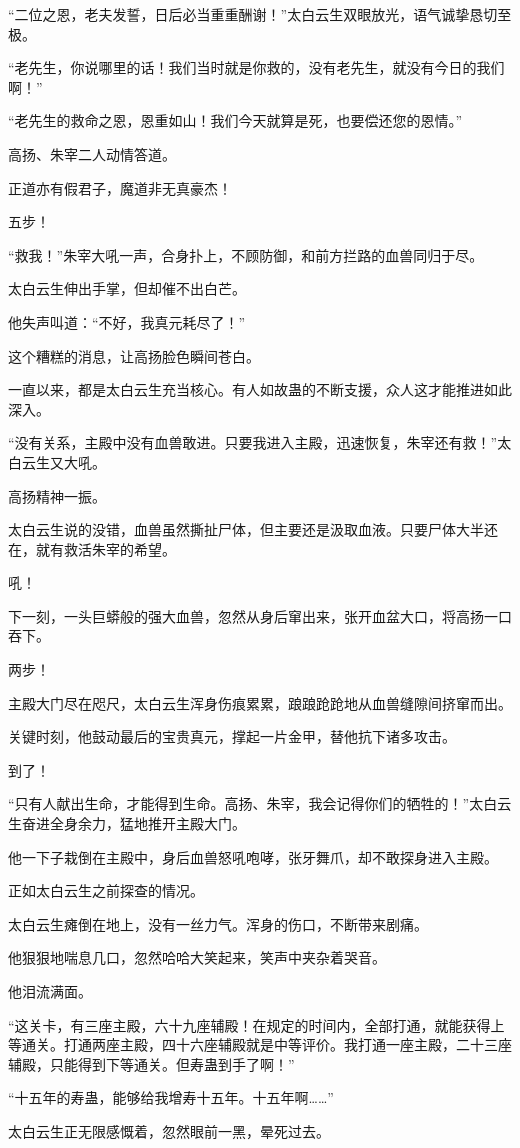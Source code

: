 \begin{this_body}
“二位之恩，老夫发誓，日后必当重重酬谢！”太白云生双眼放光，语气诚挚恳切至极。

“老先生，你说哪里的话！我们当时就是你救的，没有老先生，就没有今日的我们啊！”

“老先生的救命之恩，恩重如山！我们今天就算是死，也要偿还您的恩情。”

高扬、朱宰二人动情答道。

正道亦有假君子，魔道非无真豪杰！

五步！

“救我！”朱宰大吼一声，合身扑上，不顾防御，和前方拦路的血兽同归于尽。

太白云生伸出手掌，但却催不出白芒。

他失声叫道：“不好，我真元耗尽了！”

这个糟糕的消息，让高扬脸色瞬间苍白。

一直以来，都是太白云生充当核心。有人如故蛊的不断支援，众人这才能推进如此深入。

“没有关系，主殿中没有血兽敢进。只要我进入主殿，迅速恢复，朱宰还有救！”太白云生又大吼。

高扬精神一振。

太白云生说的没错，血兽虽然撕扯尸体，但主要还是汲取血液。只要尸体大半还在，就有救活朱宰的希望。

吼！

下一刻，一头巨蟒般的强大血兽，忽然从身后窜出来，张开血盆大口，将高扬一口吞下。

两步！

主殿大门尽在咫尺，太白云生浑身伤痕累累，踉踉跄跄地从血兽缝隙间挤窜而出。

关键时刻，他鼓动最后的宝贵真元，撑起一片金甲，替他抗下诸多攻击。

到了！

“只有人献出生命，才能得到生命。高扬、朱宰，我会记得你们的牺牲的！”太白云生奋进全身余力，猛地推开主殿大门。

他一下子栽倒在主殿中，身后血兽怒吼咆哮，张牙舞爪，却不敢探身进入主殿。

正如太白云生之前探查的情况。

太白云生瘫倒在地上，没有一丝力气。浑身的伤口，不断带来剧痛。

他狠狠地喘息几口，忽然哈哈大笑起来，笑声中夹杂着哭音。

他泪流满面。

“这关卡，有三座主殿，六十九座辅殿！在规定的时间内，全部打通，就能获得上等通关。打通两座主殿，四十六座辅殿就是中等评价。我打通一座主殿，二十三座辅殿，只能得到下等通关。但寿蛊到手了啊！”

“十五年的寿蛊，能够给我增寿十五年。十五年啊……”

太白云生正无限感慨着，忽然眼前一黑，晕死过去。

\end{this_body}

